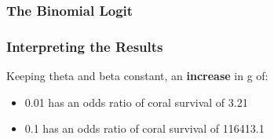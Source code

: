 \begin{frame}\frametitle{The Binomial Logit}
{\fontsize{8}{3} \color{RBlue} }
\end{frame}

\begin{frame}\frametitle{Interpreting the Results}
Keeping theta and beta constant, an \textbf{increase} in g of:
\begin{itemize}
\item 0.01 has an odds ratio of coral survival of 3.21\\
\item 0.1 has an odds ratio of coral survival of 116413.1
\end{itemize}
\end{frame}

